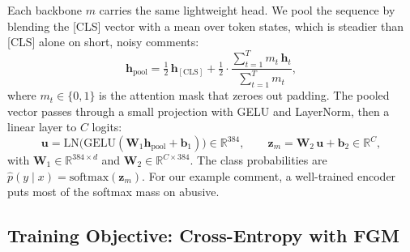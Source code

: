 \documentclass[11pt,a4paper]{article}
\def\texttt#1{#1}%
\def\emph#1{#1}%
\begin{document}
Each backbone $m$ carries the same lightweight head. We pool the sequence by blending the \texttt{[CLS]} vector with a mean over token states, which is steadier than \texttt{[CLS]} alone on short, noisy comments:
\begin{equation}
\mathbf{h}_{\mathrm{pool}} = \tfrac{1}{2}\,\mathbf{h}_{[\mathrm{CLS}]} + \tfrac{1}{2}\cdot\frac{\sum_{t=1}^{T} m_t\,\mathbf{h}_t}{\sum_{t=1}^{T} m_t},
\label{eq:pool}
\end{equation}
where $m_t \in \{0,1\}$ is the attention mask that zeroes out padding. The pooled vector passes through a small projection with GELU and LayerNorm, then a linear layer to $C$ logits:
\begin{equation}
\mathbf{u} = \mathrm{LN}\!\big(\mathrm{GELU}(\mathbf{W}_1 \mathbf{h}_{\mathrm{pool}} + \mathbf{b}_1)\big) \in \mathbb{R}^{384},
\qquad
\mathbf{z}_m = \mathbf{W}_2\,\mathbf{u} + \mathbf{b}_2 \in \mathbb{R}^{C},
\label{eq:head}
\end{equation}
with $\mathbf{W}_1 \in \mathbb{R}^{384 \times d}$ and $\mathbf{W}_2 \in \mathbb{R}^{C \times 384}$. The class probabilities are $\hat{p}(y \mid x) = \mathrm{softmax}(\mathbf{z}_m)$. For our example comment, a well-trained encoder puts most of the softmax mass on \emph{abusive}.

\subsection{Training Objective: Cross-Entropy with FGM}
\label{sec:objective}
\end{document}
